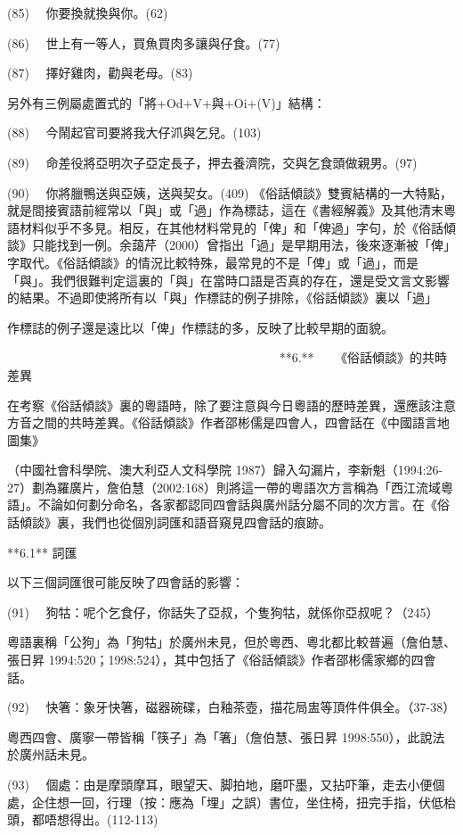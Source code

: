 (85)   你要換就換與你。(62)

(86)   世上有一等人，買魚買肉多讓與仔食。(77)

(87)   擇好雞肉，勸與老母。(83)

另外有三例屬處置式的「將+Od+V+與+Oi+(V)」結構：

(88)   今鬧起官司要將我大仔沠與乞兒。(103)

(89)   命差役將亞明次子亞定長子，押去養濟院，交與乞食頭做親男。(97)

(90)   你將臘鴨送與亞姨，送與契女。(409) 《俗話傾談》雙賓結構的一大特點，就是間接賓語前經常以「與」或「過」作為標誌，這在《書經解義》及其他清末粵語材料似乎不多見。相反，在其他材料常見的「俾」和「俾過」字句，於《俗話傾談》只能找到一例。余藹芹（2000）曾指出「過」是早期用法，後來逐漸被「俾」字取代。《俗話傾談》的情況比較特殊，最常見的不是「俾」或「過」，而是「與」。我們很難判定這裏的「與」在當時口語是否真的存在，還是受文言文影響的結果。不過即使將所有以「與」作標誌的例子排除，《俗話傾談》裏以「過」

作標誌的例子還是遠比以「俾」作標誌的多，反映了比較早期的面貌。

                                            **6.**    《俗話傾談》的共時差異

在考察《俗話傾談》裏的粵語時，除了要注意與今日粵語的歷時差異，還應該注意方音之間的共時差異。《俗話傾談》作者邵彬儒是四會人，四會話在《中國語言地圖集》

（中國社會科學院、澳大利亞人文科學院 1987）歸入勾漏片，李新魁（1994:26-27）劃為羅廣片，詹伯慧（2002:168）則將這一帶的粵語次方言稱為「西江流域粵語」。不論如何劃分命名，各家都認同四會話與廣州話分屬不同的次方言。在《俗話傾談》裏，我們也從個別詞匯和語音窺見四會話的痕跡。

**6.1** 詞匯

以下三個詞匯很可能反映了四會話的影響：

(91)   狗牯：呢个乞食仔，你話失了亞叔，个隻狗牯，就係你亞叔呢？（245）

粵語裏稱「公狗」為「狗牯」於廣州未見，但於粵西、粵北都比較普遍（詹伯慧、張日昇 1994:520；1998:524），其中包括了《俗話傾談》作者邵彬儒家鄉的四會話。

(92)   快箸：象牙快箸，磁器碗碟，白釉茶壺，描花局盅等頂件件俱全。（37-38）

粵西四會、廣寧一帶皆稱「筷子」為「箸」（詹伯慧、張日昇 1998:550），此說法於廣州話未見。

(93)   個處：由是摩頭摩耳，眼望天、脚拍地，磨吓墨，又拈吓筆，走去小便個處，企住想一回，行理（按：應為「埋」之誤）書位，坐住椅，扭完手指，伏低枱頭，都唔想得出。(112-113)

